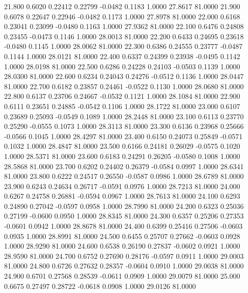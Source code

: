   21.800   0.6020   0.22412   0.22799  -0.0482   0.1183   1.0000  27.8617  81.0000
  21.900   0.6078   0.22647   0.22946  -0.0482   0.1173   1.0000  27.8978  81.0000
  22.000   0.6168   0.23041   0.23099  -0.0480   0.1163   1.0000  27.9362  81.0000
  22.100   0.6476   0.24808   0.23455  -0.0473   0.1146   1.0000  28.0013  81.0000
  22.200   0.6433   0.24695   0.23618  -0.0480   0.1145   1.0000  28.0062  81.0000
  22.300   0.6386   0.24555   0.23777  -0.0487   0.1144   1.0000  28.0121  81.0000
  22.400   0.6337   0.24399   0.23938  -0.0495   0.1142   1.0000  28.0198  81.0000
  22.500   0.6286   0.24228   0.24103  -0.0503   0.1139   1.0000  28.0300  81.0000
  22.600   0.6234   0.24043   0.24276  -0.0512   0.1136   1.0000  28.0447  81.0000
  22.700   0.6182   0.23857   0.24461  -0.0522   0.1130   1.0000  28.0680  81.0000
  22.800   0.6137   0.23706   0.24667  -0.0532   0.1121   1.0000  28.1084  81.0000
  22.900   0.6111   0.23651   0.24885  -0.0542   0.1106   1.0000  28.1722  81.0000
  23.000   0.6107   0.23689   0.25093  -0.0549   0.1089   1.0000  28.2448  81.0000
  23.100   0.6113   0.23770   0.25290  -0.0555   0.1073   1.0000  28.3113  81.0000
  23.300   0.6136   0.23968   0.25666  -0.0566   0.1045   1.0000  28.4297  81.0000
  23.400   0.6150   0.24073   0.25849  -0.0571   0.1032   1.0000  28.4847  81.0000
  23.500   0.6166   0.24181   0.26029  -0.0575   0.1020   1.0000  28.5371  81.0000
  23.600   0.6183   0.24291   0.26205  -0.0580   0.1008   1.0000  28.5868  81.0000
  23.700   0.6202   0.24402   0.26379  -0.0584   0.0997   1.0000  28.6341  81.0000
  23.800   0.6222   0.24517   0.26550  -0.0587   0.0986   1.0000  28.6789  81.0000
  23.900   0.6243   0.24634   0.26717  -0.0591   0.0976   1.0000  28.7213  81.0000
  24.000   0.6267   0.24758   0.26881  -0.0594   0.0967   1.0000  28.7613  81.0000
  24.100   0.6293   0.24890   0.27042  -0.0597   0.0958   1.0000  28.7990  81.0000
  24.200   0.6323   0.25036   0.27199  -0.0600   0.0950   1.0000  28.8345  81.0000
  24.300   0.6357   0.25206   0.27353  -0.0601   0.0942   1.0000  28.8678  81.0000
  24.400   0.6399   0.25416   0.27506  -0.0603   0.0935   1.0000  28.8991  81.0000
  24.500   0.6455   0.25707   0.27662  -0.0603   0.0928   1.0000  28.9290  81.0000
  24.600   0.6538   0.26190   0.27837  -0.0602   0.0921   1.0000  28.9590  81.0000
  24.700   0.6752   0.27690   0.28176  -0.0597   0.0911   1.0000  29.0003  81.0000
  24.800   0.6726   0.27632   0.28357  -0.0604   0.0910   1.0000  29.0038  81.0000
  24.900   0.6701   0.27568   0.28539  -0.0611   0.0909   1.0000  29.0079  81.0000
  25.000   0.6675   0.27497   0.28722  -0.0618   0.0908   1.0000  29.0126  81.0000
